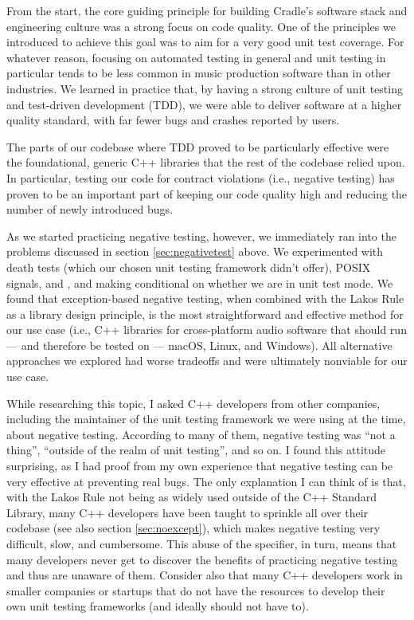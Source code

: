 From the start, the core guiding principle for building Cradle's software stack and engineering culture was a strong focus on code quality. One of the principles we introduced to achieve this goal was to aim for a very good unit test coverage. For whatever reason, focusing on automated testing in general and unit testing in particular tends to be less common in  music production software than in other industries. We learned in practice that, by having a strong culture of unit testing and test-driven development (TDD), we were able to deliver software at a higher quality standard, with far fewer bugs and crashes reported by users.

The parts of our codebase where TDD proved to be particularly effective were the foundational, generic C++ libraries that the rest of the codebase relied upon. In particular, testing our code for contract violations (i.e., negative testing) has proven to be an important part of keeping our code quality high and reducing the number of newly introduced bugs. 

As we started practicing negative testing, however, we immediately ran into the problems discussed in section \ref{sec:negativetest} above. We experimented with death tests (which our chosen unit testing framework didn't offer), POSIX signals,  and , and making  conditional on whether we are in unit test mode. We found that exception-based negative testing, when combined with the Lakos Rule as a library design principle, is the most straightforward and effective method for our use case (i.e., C++ libraries for cross-platform audio software that should run --- and therefore be tested on --- macOS, Linux, and Windows). All alternative approaches we explored had worse tradeoffs and were ultimately nonviable for our use case.

While researching this topic, I asked C++ developers from other companies, including the maintainer of the unit testing framework we were using at the time, about negative testing. According to many of them, negative testing was ``not a thing'', ``outside of the realm of unit testing'', and so on. I found this attitude surprising, as I had proof from my own experience that negative testing can be very effective at preventing real bugs. The only explanation I can think of is that, with the Lakos Rule not being as widely used outside of the C++ Standard Library, many C++ developers have been taught to sprinkle  all over their codebase (see also section \ref{sec:noexcept}), which makes negative testing very difficult, slow, and cumbersome. This abuse of the  specifier, in turn, means that many developers never get to discover the benefits of practicing negative testing and thus are unaware of them. Consider also that many C++ developers work in smaller companies or startups that do not have the resources to develop their own unit testing frameworks (and ideally should not have to).

